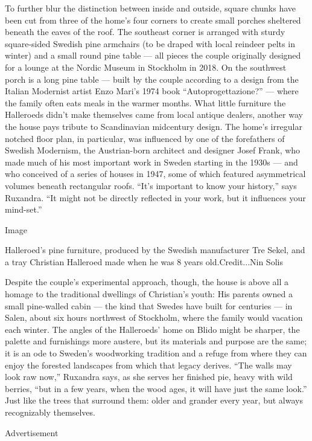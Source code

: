 To further blur the distinction between inside and outside, square
chunks have been cut from three of the home's four corners to create
small porches sheltered beneath the eaves of the roof. The southeast
corner is arranged with sturdy square-sided Swedish pine armchairs (to
be draped with local reindeer pelts in winter) and a small round pine
table --- all pieces the couple originally designed for a lounge at the
Nordic Museum in Stockholm in 2018. On the southwest porch is a long
pine table --- built by the couple according to a design from the
Italian Modernist artist Enzo Mari's 1974 book ``Autoprogettazione?''
--- where the family often eats meals in the warmer months. What little
furniture the Halleroeds didn't make themselves came from local antique
dealers, another way the house pays tribute to Scandinavian midcentury
design. The home's irregular notched floor plan, in particular, was
influenced by one of the forefathers of Swedish Modernism, the
Austrian-born architect and designer Josef Frank, who made much of his
most important work in Sweden starting in the 1930s --- and who
conceived of a series of houses in 1947, some of which featured
asymmetrical volumes beneath rectangular roofs. ``It's important to know
your history,'' says Ruxandra. ``It might not be directly reflected in
your work, but it influences your mind-set.''

Image

Halleroed's pine furniture, produced by the Swedish manufacturer Tre
Sekel, and a tray Christian Halleroed made when he was 8 years
old.Credit...Nin Solis

Despite the couple's experimental approach, though, the house is above
all a homage to the traditional dwellings of Christian's youth: His
parents owned a small pine-walled cabin --- the kind that Swedes have
built for centuries --- in Salen, about six hours northwest of
Stockholm, where the family would vacation each winter. The angles of
the Halleroeds' home on Blido might be sharper, the palette and
furnishings more austere, but its materials and purpose are the same; it
is an ode to Sweden's woodworking tradition and a refuge from where they
can enjoy the forested landscapes from which that legacy derives. ``The
walls may look raw now,'' Ruxandra says, as she serves her finished pie,
heavy with wild berries, ``but in a few years, when the wood ages, it
will have just the same look.'' Just like the trees that surround them:
older and grander every year, but always recognizably themselves.

Advertisement

